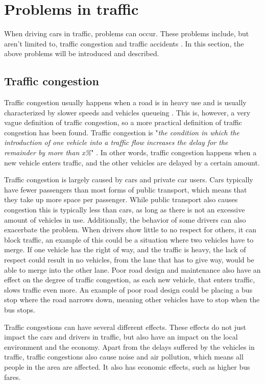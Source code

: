 \section{Problems in traffic}\label{probana:problemsTraffic}
When driving cars in traffic, problems can occur.
These problems include, but aren't limited to, traffic congestion and traffic accidents \cite{annual_accident_report_2018, bull_urban_2002}.
In this section, the above problems will be introduced and described.

\subsection{Traffic congestion}
Traffic congestion usually happens when a road is in heavy use and is usually characterized by slower speeds and vehicles queueing \cite{bull_traffic_2003}.
This is, however, a very vague definition of traffic congestion, so a more practical definition of traffic congestion has been found.
Traffic congestion is "\textit{the condition in which the introduction of one vehicle into a traffic flow increases the delay for the remainder by more than x\%}" \cite{bull_urban_2002}.
In other words, traffic congestion happens when a new vehicle enters traffic, and the other vehicles are delayed by a certain amount.

Traffic congestion is largely caused by cars and private car users.
Cars typically have fewer passengers than most forms of public transport, which means that they take up more space per passenger.
While public transport also causes congestion this is typically less than cars, as long as there is not an excessive amount of vehicles in use.
Additionally, the behavior of some drivers can also exacerbate the problem.
When drivers show little to no respect for others, it can block traffic, an example of this could be a situation where two vehicles have to merge.
If one vehicle has the right of way, and the traffic is heavy, the lack of respect could result in no vehicles, from the lane that has to give way, would be able to merge into the other lane.
Poor road design and maintenance also have an effect on the degree of traffic congestion, as each new vehicle, that enters traffic, slows traffic even more.
An example of poor road design could be placing a bus stop where the road narrows down, meaning other vehicles have to stop when the bus stops. \cite{bull_urban_2002, bull_traffic_2003, ukpata_traffic_2012}

Traffic congestions can have several different effects.
These effects do not just impact the cars and drivers in traffic, but also have an impact on the local environment and the economy.
Apart from the delays suffered by the vehicles in traffic, traffic congestions also cause noise and air pollution, which means all people in the area are affected.
It also has economic effects, such as higher bus fares. \cite{bull_urban_2002, bull_traffic_2003}

